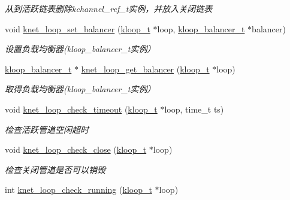 \begin{DoxyCompactItemize}
\begin{DoxyCompactList}\small\item\em 从到活跃链表删除kchannel\+\_\+ref\+\_\+t实例，并放入关闭链表 \end{DoxyCompactList}\item 
void \hyperlink{a00071_afa47d6d4673ddfd9e4884d3c9aca7f7e_afa47d6d4673ddfd9e4884d3c9aca7f7e}{knet\+\_\+loop\+\_\+set\+\_\+balancer} (\hyperlink{a00053_a97fc76209a58362019f1ded9169e397f_a97fc76209a58362019f1ded9169e397f}{kloop\+\_\+t} $\ast$loop, \hyperlink{a00053_abd3f964265beb2f8984e76f44fb5ea33_abd3f964265beb2f8984e76f44fb5ea33}{kloop\+\_\+balancer\+\_\+t} $\ast$balancer)
\begin{DoxyCompactList}\small\item\em 设置负载均衡器(kloop\+\_\+balancer\+\_\+t实例） \end{DoxyCompactList}\item 
\hyperlink{a00053_abd3f964265beb2f8984e76f44fb5ea33_abd3f964265beb2f8984e76f44fb5ea33}{kloop\+\_\+balancer\+\_\+t} $\ast$ \hyperlink{a00071_a775164485cff0fc31bc0d71204d44aca_a775164485cff0fc31bc0d71204d44aca}{knet\+\_\+loop\+\_\+get\+\_\+balancer} (\hyperlink{a00053_a97fc76209a58362019f1ded9169e397f_a97fc76209a58362019f1ded9169e397f}{kloop\+\_\+t} $\ast$loop)
\begin{DoxyCompactList}\small\item\em 取得负载均衡器(kloop\+\_\+balancer\+\_\+t实例） \end{DoxyCompactList}\item 
void \hyperlink{a00071_a00c96dec79cb9493a01cef8bb52534f4_a00c96dec79cb9493a01cef8bb52534f4}{knet\+\_\+loop\+\_\+check\+\_\+timeout} (\hyperlink{a00053_a97fc76209a58362019f1ded9169e397f_a97fc76209a58362019f1ded9169e397f}{kloop\+\_\+t} $\ast$loop, time\+\_\+t ts)
\begin{DoxyCompactList}\small\item\em 检查活跃管道空闲超时 \end{DoxyCompactList}\item 
void \hyperlink{a00071_a58a5c12ddf68c8cc9f21c373bc0bcc6f_a58a5c12ddf68c8cc9f21c373bc0bcc6f}{knet\+\_\+loop\+\_\+check\+\_\+close} (\hyperlink{a00053_a97fc76209a58362019f1ded9169e397f_a97fc76209a58362019f1ded9169e397f}{kloop\+\_\+t} $\ast$loop)
\begin{DoxyCompactList}\small\item\em 检查关闭管道是否可以销毁 \end{DoxyCompactList}\item 
int \hyperlink{a00071_af8babef4a6cb0c64d5bd25665cc36821_af8babef4a6cb0c64d5bd25665cc36821}{knet\+\_\+loop\+\_\+check\+\_\+running} (\hyperlink{a00053_a97fc76209a58362019f1ded9169e397f_a97fc76209a58362019f1ded9169e397f}{kloop\+\_\+t} $\ast$loop)

\end{DoxyCompactItemize}
